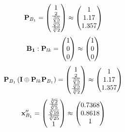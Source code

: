 \documentclass[10pt,a4paper]{article}
\begin{document}
	\[
		\bold{P}_{B_1} = 
		\begin{pmatrix}
			{1} {} \\
			\frac{{2}} {\sqrt[3]{5}} \\
			\frac{\sqrt[3]{5}} {\sqrt[3]{2}} \\
		\end{pmatrix}
		\approx
		\begin{pmatrix}
			1        \\
			1.17     \\
			1.357    \\
		\end{pmatrix}
	\]
	\[
		\bold{B_1}: \bold{P}_{lk} = 
		\begin{pmatrix}
			{1} {} \\
			{{0}} {} \\
			{{0}} {} \\
		\end{pmatrix}
		\approx
		\begin{pmatrix}
			1        \\
			0        \\
			0        \\
		\end{pmatrix}
	\]
	\[
		\bold{P}_{B_1}\left(\bold{I} \oplus \bold{P}_{lk}\bold{P}_{B_1}\right) = 
		\begin{pmatrix}
			{1} {} \\
			\frac{{2}} {\sqrt[3]{5}} \\
			\frac{\sqrt[3]{5}} {\sqrt[3]{2}} \\
		\end{pmatrix}
		\approx
		\begin{pmatrix}
			1        \\
			1.17     \\
			1.357    \\
		\end{pmatrix}
	\]
	\[
		\bold{x}''_{B_1} = 
		\begin{pmatrix}
			\frac{\sqrt[3]{2}} {\sqrt[3]{5}} \\
			\frac{\sqrt[3]{16}} {\sqrt[3]{25}} \\
			{1} {} \\
		\end{pmatrix}
		\approx
		\begin{pmatrix}
			0.7368   \\
			0.8618   \\
			1        \\
		\end{pmatrix}
	\]
\end{document}
